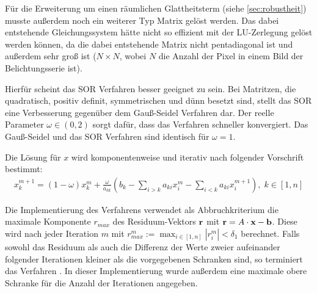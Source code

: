 Für die Erweiterung um einen räumlichen Glattheitsterm (siehe \autoref{sec:robustheit}) musste außerdem noch ein weiterer Typ Matrix gelöst werden. Das dabei entstehende Gleichungssystem hätte nicht so effizient mit der LU-Zerlegung gelöst werden können, da die dabei entstehende Matrix nicht pentadiagonal ist und außerdem sehr groß ist ($N \times N$, wobei $N$ die Anzahl der Pixel in einem Bild der Belichtungsserie ist). 

Hierfür scheint das \gls{SOR} Verfahren besser geeignet zu sein. Bei Matritzen, die quadratisch, positiv definit, symmetrischen und dünn besetzt sind, stellt das \gls{SOR} eine Verbesserung gegenüber dem Gauß-Seidel Verfahren dar. Der reelle Parameter $\omega \in (0,2)$ sorgt dafür, dass das Verfahren schneller konvergiert. Das Gauß-Seidel und das \gls{SOR} Verfahren sind identisch für $\omega = 1 $.

Die Lösung für $x$ wird komponentenweise und iterativ nach folgender Vorschrift bestimmt:
\begin{align}
x_k^{m+1} = (1-\omega)x_k^m+ \frac{\omega}{a_{kk}}(b_k - \sum_{i>k} a_{ki}x_i^m - \sum_{i<k} a_{ki}x_{i}^{m+1}) ,\; k \in [1, n]
\end{align}

Die Implementierung des Verfahrens verwendet als Abbruchkriterium die maximale Komponente $r_{max}$ des Residuum-Vektors $\mathbf r$ mit $\mathbf r = A \cdot \mathbf x - \mathbf b$. Diese wird nach jeder Iteration $m$ mit $r_{max}^m := \max_{i\in [1,n]} |r_i^m| < \delta_1$ berechnet. Falls sowohl das Residuum  als auch die Differenz der Werte zweier aufeinander folgender Iterationen kleiner als die vorgegebenen Schranken sind, so terminiert das Verfahren \cite[S. 143]{Westermann2008}. In dieser Implementierung wurde außerdem eine maximale obere Schranke für die Anzahl der Iterationen angegeben.


